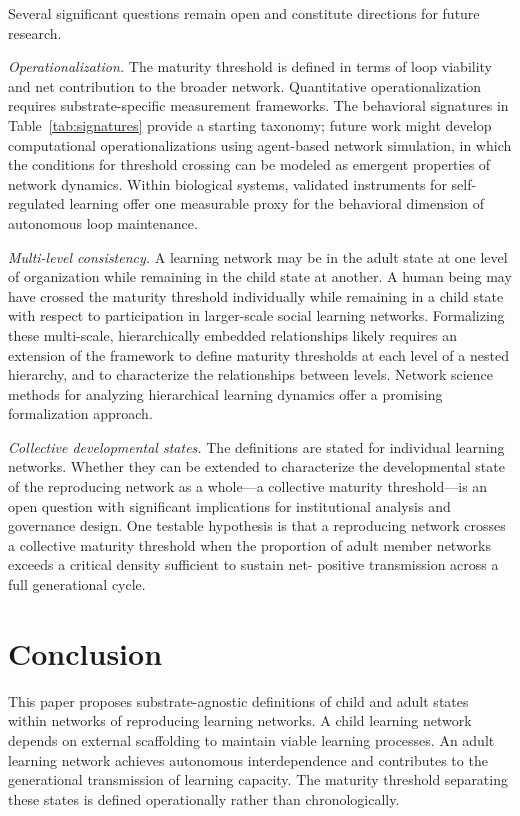 \documentclass[11pt]{article}
\begin{document}
Several significant questions remain open and constitute directions for future research.

\textit{Operationalization.} The maturity threshold is defined in terms of loop viability
and net contribution to the broader network. Quantitative operationalization requires
substrate-specific measurement frameworks. The behavioral signatures in
Table~\ref{tab:signatures} provide a starting taxonomy; future work might develop
computational operationalizations using agent-based network simulation, in which the
conditions for threshold crossing can be modeled as emergent properties of network dynamics.
Within biological systems, validated instruments for self-regulated learning offer one
measurable proxy for the behavioral dimension of autonomous loop maintenance.

\textit{Multi-level consistency.} A learning network may be in the adult state at one level
of organization while remaining in the child state at another. A human being may have
crossed the maturity threshold individually while remaining in a child state with respect to
participation in larger-scale social learning networks. Formalizing these multi-scale,
hierarchically embedded relationships likely requires an extension of the framework to
define maturity thresholds at each level of a nested hierarchy, and to characterize the
relationships between levels. Network science methods for analyzing hierarchical learning
dynamics offer a promising formalization approach.

\textit{Collective developmental states.} The definitions are stated for individual learning
networks. Whether they can be extended to characterize the developmental state of the
reproducing network as a whole---a collective maturity threshold---is an open question with
significant implications for institutional analysis and governance design. One testable
hypothesis is that a reproducing network crosses a collective maturity threshold when the
proportion of adult member networks exceeds a critical density sufficient to sustain net-
positive transmission across a full generational cycle.

\section{Conclusion}

This paper proposes substrate-agnostic definitions of child and adult states within networks
of reproducing learning networks. A child learning network depends on external scaffolding
to maintain viable learning processes. An adult learning network achieves autonomous
interdependence and contributes to the generational transmission of learning capacity. The
maturity threshold separating these states is defined operationally rather than
chronologically.
\end{document}
